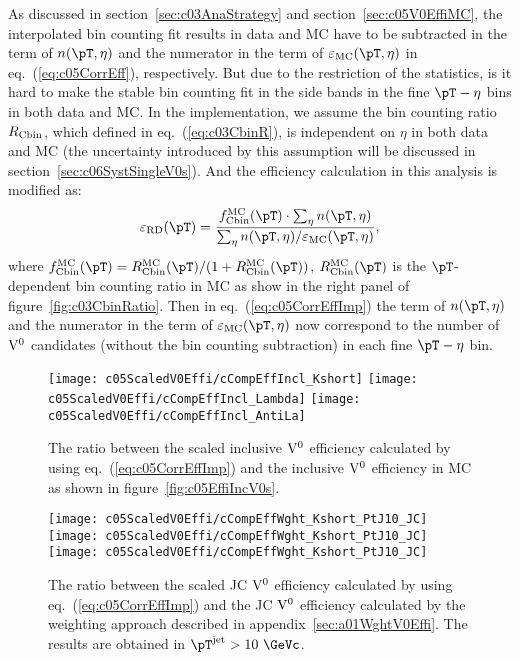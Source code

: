 As discussed in section~\ref{sec:c03AnaStrategy} and
section~\ref{sec:c05V0EffiMC},
the interpolated bin counting fit results in data and MC have to be
subtracted in the term of $n(\pT,\eta)$ and the numerator
in the term of $\varepsilon_{\rm MC}(\pT,\eta)$ in eq.~(\ref{eq:c05CorrEff}),
respectively.
But due to the restriction of the statistics,
is it hard to make the stable bin counting fit in the side bands
in the fine $\pT-\eta$ bins in both data and MC.
In the implementation, we assume the bin counting ratio $R_{\rm Cbin}$,
which defined in eq.~(\ref{eq:c03CbinR}),
is independent on $\eta$ in both data and
MC (the uncertainty introduced by this assumption will
be discussed in section~\ref{sec:c06SystSingleV0s}).
And the efficiency calculation in this analysis is modified as:
\begin{equation}\label{eq:c05CorrEffImp}
\varepsilon_{\rm RD}(\pT)=
\frac{f_{\rm Cbin}^{\rm MC}(\pT)\cdot\sum_{\eta}n(\pT,\eta)}
     {\sum_{\eta}n(\pT,\eta)/\varepsilon_{\rm MC}(\pT,\eta)},
\end{equation}
where $f_{\rm Cbin}^{\rm MC}(\pT)=
       R_{\rm Cbin}^{\rm MC}(\pT)/(1+R_{\rm Cbin}^{\rm MC}(\pT))$,
$R_{\rm Cbin}^{\rm MC}(\pT)$ is the $\pT$-dependent bin counting ratio
in MC as show in the right panel of figure~\ref{fig:c03CbinRatio}.
Then in eq.~(\ref{eq:c05CorrEffImp}) the term of $n(\pT,\eta)$ and the
numerator in the term of $\varepsilon_{\rm MC}(\pT,\eta)$ now correspond to
the number of ${\rm V}^{0}$ candidates (without the bin counting subtraction) in
each fine $\pT-\eta$ bin.

\begin{figure}[htb]
\begin{center}
\texttt{[image: c05ScaledV0Effi/cCompEffIncl\_Kshort]}
\texttt{[image: c05ScaledV0Effi/cCompEffIncl\_Lambda]}
\texttt{[image: c05ScaledV0Effi/cCompEffIncl\_AntiLa]}
\caption{The ratio between the scaled inclusive ${\rm V}^{0}$ efficiency
         calculated by using eq.~(\ref{eq:c05CorrEffImp}) and the
         inclusive ${\rm V}^{0}$ efficiency in MC as shown
         in figure~\ref{fig:c05EffiIncV0s}.}
\label{fig:c05CompScaledEff}
\end{center}
\end{figure}

\begin{figure}[htb]
\begin{center}
\texttt{[image: c05ScaledV0Effi/cCompEffWght\_Kshort\_PtJ10\_JC]}
\texttt{[image: c05ScaledV0Effi/cCompEffWght\_Kshort\_PtJ10\_JC]}
\texttt{[image: c05ScaledV0Effi/cCompEffWght\_Kshort\_PtJ10\_JC]}
\caption{The ratio between the scaled JC ${\rm V}^{0}$ efficiency calculated by
         using eq.~(\ref{eq:c05CorrEffImp}) and the JC ${\rm V}^{0}$ efficiency
         calculated by the weighting approach described in
         appendix~\ref{sec:a01WghtV0Effi}.
         The results are obtained in $\pT^{\rm jet}>10~\GeVc$.}
\label{fig:c05CompScaledWghtPtJ10JC}
\end{center}
\end{figure}


